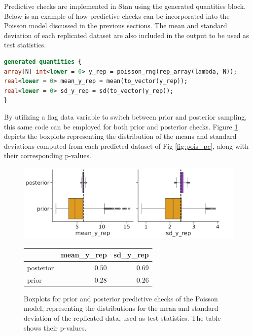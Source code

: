 Predictive checks are implemented in Stan using the generated quantities block. Below is an example of how predictive
checks can be incorporated into the Poisson model discussed in the previous sections. The mean and standard deviation of each replicated dataset are also included in the output to be used as test statistics.

\begin{lstlisting}[language=Stan]
generated quantities {
array[N] int<lower = 0> y_rep = poisson_rng(rep_array(lambda, N));
real<lower = 0> mean_y_rep = mean(to_vector(y_rep));
real<lower = 0> sd_y_rep = sd(to_vector(y_rep));
}
\end{lstlisting}

By utilizing a flag data variable to switch between prior and posterior sampling, this same code can be employed for
both prior and posterior checks. Figure \ref{fig:pois_pc2} depicts the boxplots representing the distribution of the
means and standard deviations computed from each predicted dataset of Fig \ref{fig:pois_pc}, along with their corresponding p-values.
\begin{figure}[t]
  \begin{minipage}{0.6\linewidth}
    \includegraphics[width=\linewidth]{figures/ch2/poisson/cat_plot_1.pdf}
  \end{minipage}
  \hfill
  \begin{minipage}{0.4\linewidth}
    \begin{tabular}{lrr}
\toprule
 & mean\_y\_rep & sd\_y\_rep \\
\midrule
posterior & 0.50 & 0.69 \\
prior & 0.28 & 0.26 \\
\bottomrule
\end{tabular}
  \end{minipage}
    \caption{Boxplots for prior and posterior predictive checks of the Poisson model, representing the distributions for the mean and standard deviation of the replicated data, used as test statistics. The table shows their p-values.}
    \label{fig:pois_pc2}
\end{figure}

